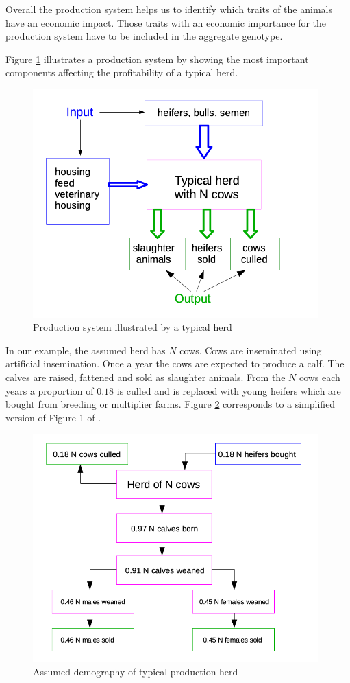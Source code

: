 \documentclass[
]{book}
\begin{document}
Overall the production system helps us to identify which traits of the animals have an economic impact. Those traits with an economic importance for the production system have to be included in the aggregate genotype.

Figure \ref{fig:gel-implbp-prodsys} illustrates a production system by showing the most important components affecting the profitability of a typical herd.

\begin{figure}
\includegraphics[width=11cm]{odg/gel-implbp-prodsys} \caption{Production system illustrated by a typical herd}\label{fig:gel-implbp-prodsys}
\end{figure}

In our example, the assumed herd has \(N\) cows. Cows are inseminated using artificial insemination. Once a year the cows are expected to produce a calf. The calves are raised, fattened and sold as slaughter animals. From the \(N\) cows each years a proportion of \(0.18\) is culled and is replaced with young heifers which are bought from breeding or multiplier farms. Figure \ref{fig:gel-implbp-demogherd} corresponds to a simplified version of Figure 1 of \citep{Phocas1998}.

\begin{figure}
\includegraphics[width=11cm]{odg/gel-implbp-demogherd} \caption{Assumed demography of typical production herd}\label{fig:gel-implbp-demogherd}
\end{figure}
\end{document}
